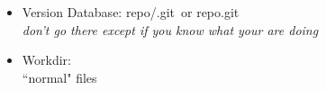 \documentclass{beamer}
\begin{document}
\begin{frame}{}
\begin{minipage}{0.59\textwidth}
\end{minipage}
\begin{minipage}{0.39\textwidth}
\begin{itemize}
\item Version Database: repo/.git~or repo.git\\
\emph{\footnotesize don't go there except if you know what your are doing}
\item Workdir:\\ ``normal" files
\end{itemize}
\end{minipage}
\end{frame}
\end{document}
